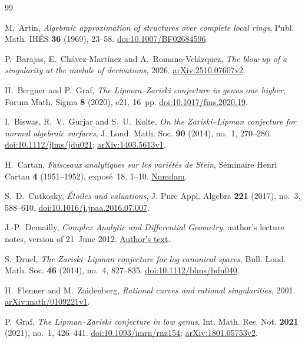 \begin{thebibliography}{99}

M.~Artin,
\emph{Algebraic approximation of structures over complete local rings},
Publ. Math. IH\'ES \textbf{36} (1969), 23--58.
\href{https://doi.org/10.1007/BF02684596}{doi:10.1007/BF02684596}.

P.~Barajas, E.~Ch\'avez-Mart\'inez and A.~Romano-Vel\'azquez,
\emph{The blow-up of a singularity at the module of derivations},
2026.
\href{https://arxiv.org/abs/2510.07607v2}{arXiv:2510.07607v2}.

H.~Bergner and P.~Graf,
\emph{The Lipman--Zariski conjecture in genus one higher},
Forum Math. Sigma \textbf{8} (2020), e21, 16~pp.
\href{https://doi.org/10.1017/fms.2020.19}{doi:10.1017/fms.2020.19}.

I.~Biswas, R.~V.~Gurjar and S.~U.~Kolte,
\emph{On the Zariski--Lipman conjecture for normal algebraic surfaces},
J. Lond. Math. Soc. \textbf{90} (2014), no.~1, 270--286.
\href{https://doi.org/10.1112/jlms/jdu021}{doi:10.1112/jlms/jdu021};
\href{https://arxiv.org/abs/1403.5613v1}{arXiv:1403.5613v1}.

H.~Cartan,
\emph{Faisceaux analytiques sur les vari\'et\'es de Stein},
S\'eminaire Henri Cartan \textbf{4} (1951--1952), expos\'e~18, 1--10.
\href{https://www.numdam.org/item/SHC_1951-1952__4__A18_0/}{Numdam}.

S.~D.~Cutkosky,
\emph{\'Etoiles and valuations},
J. Pure Appl. Algebra \textbf{221} (2017), no.~3, 588--610.
\href{https://doi.org/10.1016/j.jpaa.2016.07.007}{doi:10.1016/j.jpaa.2016.07.007}.

J.-P.~Demailly,
\emph{Complex Analytic and Differential Geometry},
author's lecture notes, version of 21~June 2012.
\href{https://www-fourier.univ-grenoble-alpes.fr/~demailly/manuscripts/agbook.pdf}{Author's text}.

S.~Druel,
\emph{The Zariski--Lipman conjecture for log canonical spaces},
Bull. Lond. Math. Soc. \textbf{46} (2014), no.~4, 827--835.
\href{https://doi.org/10.1112/blms/bdu040}{doi:10.1112/blms/bdu040}.

H.~Flenner and M.~Zaidenberg,
\emph{Rational curves and rational singularities},
2001.
\href{https://arxiv.org/abs/math/0109221v1}{arXiv:math/0109221v1}.

P.~Graf,
\emph{The Lipman--Zariski conjecture in low genus},
Int. Math. Res. Not. \textbf{2021} (2021), no.~1, 426--441.
\href{https://doi.org/10.1093/imrn/rnz154}{doi:10.1093/imrn/rnz154};
\href{https://arxiv.org/abs/1801.05753v2}{arXiv:1801.05753v2}.


\end{thebibliography}
